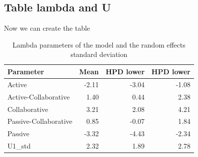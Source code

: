 \documentclass[
]{book}
\newenvironment{Shaded}{\begin{snugshade}}{\end{snugshade}}
\newcommand{\CommentTok}[1]{\textcolor[rgb]{0.56,0.35,0.01}{\textit{#1}}}
\newcommand{\DataTypeTok}[1]{\textcolor[rgb]{0.13,0.29,0.53}{#1}}
\newcommand{\DecValTok}[1]{\textcolor[rgb]{0.00,0.00,0.81}{#1}}
\newcommand{\KeywordTok}[1]{\textcolor[rgb]{0.13,0.29,0.53}{\textbf{#1}}}
\newcommand{\NormalTok}[1]{#1}
\newcommand{\OperatorTok}[1]{\textcolor[rgb]{0.81,0.36,0.00}{\textbf{#1}}}
\newcommand{\StringTok}[1]{\textcolor[rgb]{0.31,0.60,0.02}{#1}}
\begin{document}
\hypertarget{table-lambda-and-u}{%
\subsection{Table lambda and U}\label{table-lambda-and-u}}

Now we can create the table

\begin{Shaded}
\end{Shaded}

\begin{table}

\caption{\label{tab:unnamed-chunk-98}Lambda parameters of the model and the random effects standard deviation}
\centering
\begin{tabular}[t]{l|r|r|r}
\hline
Parameter & Mean & HPD lower & HPD lower\\
\hline
Active & -2.11 & -3.04 & -1.08\\
\hline
Active-Collaborative & 1.40 & 0.44 & 2.38\\
\hline
Collaborative & 3.21 & 2.08 & 4.21\\
\hline
Passive-Collaborative & 0.85 & -0.07 & 1.84\\
\hline
Passive & -3.32 & -4.43 & -2.34\\
\hline
U1\_std & 2.32 & 1.89 & 2.78\\
\hline
\end{tabular}
\end{table}
\end{document}
